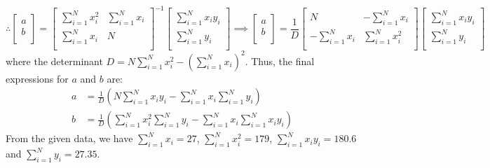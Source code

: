 \documentclass[a4paper, 11pt]{article}
\begin{document}
\begin{enumerate}[label=(\arabic*),leftmargin=*]
$$\therefore \begin{bmatrix}
	a\\
	b\\
\end{bmatrix}=\begin{bmatrix}
	\displaystyle\sum_{i=1}^N x_i^2 & \displaystyle\sum_{i=1}^N x_i\\
	\displaystyle\sum_{i=1}^N x_i & N\\
\end{bmatrix}^{-1}\begin{bmatrix}
	\displaystyle\sum_{i=1}^N x_iy_i\\
	\displaystyle\sum_{i=1}^N y_i\\
\end{bmatrix}\implies 
	\begin{bmatrix}
	a\\
	b\\
\end{bmatrix}=\frac{1}{D}\begin{bmatrix}
	N & \displaystyle -\sum_{i=1}^N x_i\\
	\displaystyle -\sum_{i=1}^N x_i & \displaystyle\sum_{i=1}^N x_i^2\\
\end{bmatrix}\begin{bmatrix}
	\displaystyle\sum_{i=1}^N x_iy_i\\
	\displaystyle\sum_{i=1}^N y_i\\
\end{bmatrix}$$
where the determinant $\displaystyle D=N\sum_{i=1}^N x_i^2-\left(\sum_{i=1}^N x_i\right)^2$. Thus, the final expressions for $a$ and $b$ are:
\begin{align*}
	a&=\frac{1}{D}\left(N\sum_{i=1}^N x_iy_i-\sum_{i=1}^N x_i\sum_{i=1}^N y_i\right)\\
	b&=\frac{1}{D}\left(\sum_{i=1}^N x_i^2\sum_{i=1}^N y_i-\sum_{i=1}^N x_i\sum_{i=1}^N x_iy_i\right)
\end{align*}
From the given data, we have $\displaystyle\sum_{i=1}^N x_i=27$, $\displaystyle\sum_{i=1}^N x_i^2=179$, $\displaystyle\sum_{i=1}^N x_iy_i=180.6$ and $\displaystyle\sum_{i=1}^N y_i=27.35$. 


\end{enumerate}
\end{document}
